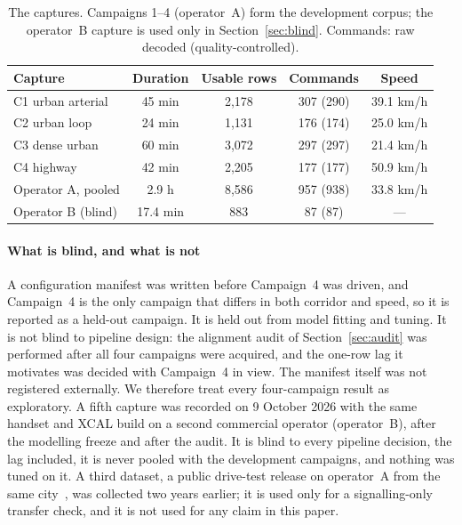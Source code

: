 \documentclass[preprint,review,12pt]{elsarticle}\usepackage{lineno}\linenumbers
\begin{document}
\begin{table}[t]
\centering
\caption{The captures. Campaigns 1--4 (operator~A) form the development corpus; the operator~B capture is used only in Section~\ref{sec:blind}. Commands: raw decoded (quality-controlled).}
\label{tab:corpus}
\footnotesize
\setlength{\tabcolsep}{3pt}
\begin{tabularx}{\linewidth}{X c c c c}
\toprule
\textbf{Capture} & \textbf{Duration} & \textbf{Usable rows} & \textbf{Commands} & \textbf{Speed} \\
\midrule
C1 urban arterial & 45 min & 2,178 & 307 (290) & 39.1 km/h \\
C2 urban loop & 24 min & 1,131 & 176 (174) & 25.0 km/h \\
C3 dense urban & 60 min & 3,072 & 297 (297) & 21.4 km/h \\
C4 highway & 42 min & 2,205 & 177 (177) & 50.9 km/h \\
Operator A, pooled & 2.9 h & 8,586 & 957 (938) & 33.8 km/h \\
\midrule
Operator B (blind) & 17.4 min & 883 & 87 (87) & --- \\
\bottomrule
\end{tabularx}
\end{table}

\paragraph{What is blind, and what is not} A configuration manifest was written before Campaign~4 was driven, and Campaign~4 is the only campaign that differs in both corridor and speed, so it is reported as a held-out campaign. It is held out from model fitting and tuning. It is not blind to pipeline design: the alignment audit of Section~\ref{sec:audit} was performed after all four campaigns were acquired, and the one-row lag it motivates was decided with Campaign~4 in view. The manifest itself was not registered externally. We therefore treat every four-campaign result as exploratory. A fifth capture was recorded on 9 October 2026 with the same handset and XCAL build on a second commercial operator (operator~B), after the modelling freeze and after the audit. It is blind to every pipeline decision, the lag included, it is never pooled with the development campaigns, and nothing was tuned on it. A third dataset, a public drive-test release on operator~A from the same city~\cite{ref38}, was collected two years earlier; it is used only for a signalling-only transfer check, and it is not used for any claim in this paper.
\end{document}
